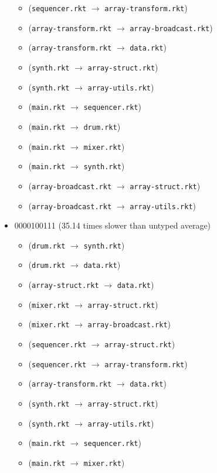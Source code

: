 \documentclass{article}
\newcommand{\mono}[1]{\texttt{#1}}
\begin{document}
\begin{itemize}
\begin{itemize}
  \item (\mono{sequencer.rkt} $\rightarrow$ \mono{array-transform.rkt})
  \item (\mono{array-transform.rkt} $\rightarrow$ \mono{array-broadcast.rkt})
  \item (\mono{array-transform.rkt} $\rightarrow$ \mono{data.rkt})
  \item (\mono{synth.rkt} $\rightarrow$ \mono{array-struct.rkt})
  \item (\mono{synth.rkt} $\rightarrow$ \mono{array-utils.rkt})
  \item (\mono{main.rkt} $\rightarrow$ \mono{sequencer.rkt})
  \item (\mono{main.rkt} $\rightarrow$ \mono{drum.rkt})
  \item (\mono{main.rkt} $\rightarrow$ \mono{mixer.rkt})
  \item (\mono{main.rkt} $\rightarrow$ \mono{synth.rkt})
  \item (\mono{array-broadcast.rkt} $\rightarrow$ \mono{array-struct.rkt})
  \item (\mono{array-broadcast.rkt} $\rightarrow$ \mono{array-utils.rkt})
  \end{itemize}
\item 0000100111 (35.14 times slower than untyped average)
  \begin{itemize}
  \item (\mono{drum.rkt} $\rightarrow$ \mono{synth.rkt})
  \item (\mono{drum.rkt} $\rightarrow$ \mono{data.rkt})
  \item (\mono{array-struct.rkt} $\rightarrow$ \mono{data.rkt})
  \item (\mono{mixer.rkt} $\rightarrow$ \mono{array-struct.rkt})
  \item (\mono{mixer.rkt} $\rightarrow$ \mono{array-broadcast.rkt})
  \item (\mono{sequencer.rkt} $\rightarrow$ \mono{array-struct.rkt})
  \item (\mono{sequencer.rkt} $\rightarrow$ \mono{array-transform.rkt})
  \item (\mono{array-transform.rkt} $\rightarrow$ \mono{data.rkt})
  \item (\mono{synth.rkt} $\rightarrow$ \mono{array-struct.rkt})
  \item (\mono{synth.rkt} $\rightarrow$ \mono{array-utils.rkt})
  \item (\mono{main.rkt} $\rightarrow$ \mono{sequencer.rkt})
  \item (\mono{main.rkt} $\rightarrow$ \mono{mixer.rkt})

\end{itemize}
\end{itemize}
\end{document}
